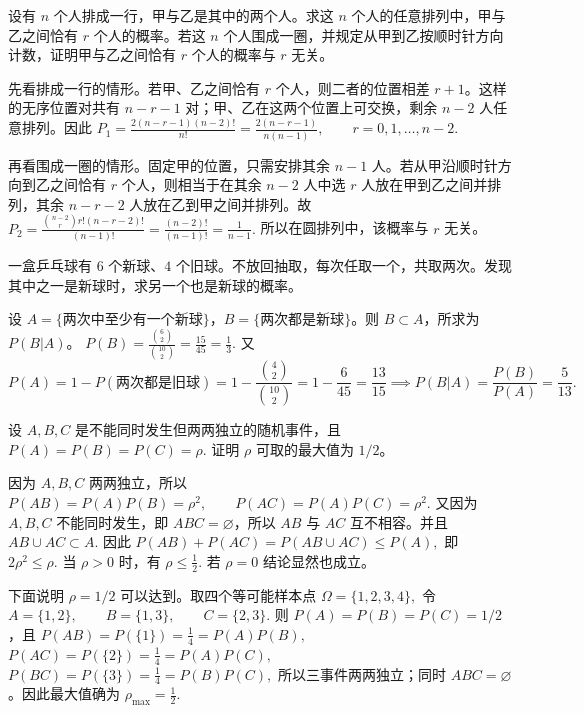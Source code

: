 \documentclass[lang=cn,11pt]{elegantbook}
\begin{document}
\begin{exercise}\label{exer:src-2014-spring-a-01}
设有 \(n\) 个人排成一行，甲与乙是其中的两个人。求这 \(n\) 个人的任意排列中，甲与乙之间恰有 \(r\) 个人的概率。若这 \(n\) 个人围成一圈，并规定从甲到乙按顺时针方向计数，证明甲与乙之间恰有 \(r\) 个人的概率与 \(r\) 无关。
\end{exercise}
\begin{solution}
先看排成一行的情形。若甲、乙之间恰有 \(r\) 个人，则二者的位置相差 \(r+1\)。这样的无序位置对共有
\(
n-r-1
\)
对；甲、乙在这两个位置上可交换，剩余 \(n-2\) 人任意排列。因此
\(
P_1=\frac{2(n-r-1)(n-2)!}{n!}
=\frac{2(n-r-1)}{n(n-1)},\qquad r=0,1,\dots,n-2.
\)

再看围成一圈的情形。固定甲的位置，只需安排其余 \(n-1\) 人。若从甲沿顺时针方向到乙之间恰有 \(r\) 个人，则相当于在其余 \(n-2\) 人中选 \(r\) 人放在甲到乙之间并排列，其余 \(n-r-2\) 人放在乙到甲之间并排列。故
\(
P_2
=\frac{\binom{n-2}{r}r!(n-r-2)!}{(n-1)!}
=\frac{(n-2)!}{(n-1)!}
=\frac1{n-1}.
\)
所以在圆排列中，该概率与 \(r\) 无关。
\end{solution}

\begin{exercise}\label{exer:src-2008-01-3c-iv-01}\label{exer:src-paper4-iv-01}
一盒乒乓球有 \(6\) 个新球、\(4\) 个旧球。不放回抽取，每次任取一个，共取两次。发现其中之一是新球时，求另一个也是新球的概率。
\end{exercise}
\begin{solution}
设 \(A=\{\text{两次中至少有一个新球}\}\)，\(B=\{\text{两次都是新球}\}\)。则 \(B\subset A\)，所求为 \(P(B|A)\)。
\(
P(B)=\frac{\binom62}{\binom{10}2}=\frac{15}{45}=\frac13.
\)
又
\[
P(A)=1-P(\text{两次都是旧球})
=1-\frac{\binom42}{\binom{10}2}
=1-\frac6{45}
=\frac{13}{15}\implies
P(B|A)=\frac{P(B)}{P(A)}=\frac5{13}.
\]
\end{solution}


\begin{exercise}\label{exer:src-2008-01-3c-v-01}\label{exer:src-paper4-proof-01}
设 \(A,B,C\) 是不能同时发生但两两独立的随机事件，且
\(
P(A)=P(B)=P(C)=\rho.
\)
证明 \(\rho\) 可取的最大值为 \(1/2\)。
\end{exercise}
\begin{solution}
因为 \(A,B,C\) 两两独立，所以
\(
P(AB)=P(A)P(B)=\rho^2,\qquad
P(AC)=P(A)P(C)=\rho^2.
\)
又因为 \(A,B,C\) 不能同时发生，即 \(ABC=\varnothing\)，所以 \(AB\) 与 \(AC\) 互不相容。并且
\(
AB\cup AC\subset A.
\)
因此
\(
P(AB)+P(AC)=P(AB\cup AC)\le P(A),
\)
即
\(
2\rho^2\le \rho.
\)
当 \(\rho>0\) 时，有
\(
\rho\le \frac12.
\)
若 \(\rho=0\) 结论显然也成立。

下面说明 \(\rho=1/2\) 可以达到。取四个等可能样本点
\(
\Omega=\{1,2,3,4\},
\)
令
\(
A=\{1,2\},\qquad B=\{1,3\},\qquad C=\{2,3\}.
\)
则 \(P(A)=P(B)=P(C)=1/2\)，且
\(
P(AB)=P(\{1\})=\frac14=P(A)P(B),
\)
\(
P(AC)=P(\{2\})=\frac14=P(A)P(C),
\)
\(
P(BC)=P(\{3\})=\frac14=P(B)P(C),
\)
所以三事件两两独立；同时 \(ABC=\varnothing\)。因此最大值确为
\(
\rho_{\max}=\frac12.
\)
\end{solution}
\end{document}
